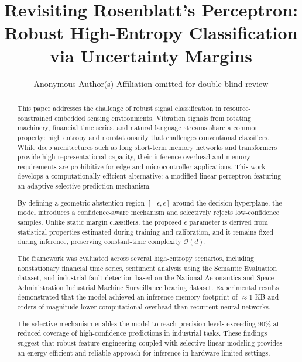 \documentclass[conference]{IEEEtran}
\begin{document}
\title{Revisiting Rosenblatt’s Perceptron: Robust High-Entropy Classification via Uncertainty Margins}

\author{
    Anonymous Author(s) Affiliation omitted for double-blind review
}

\maketitle

\begin{abstract}
This paper addresses the challenge of robust signal classification in resource-constrained embedded sensing environments. Vibration signals from rotating machinery, financial time series, and natural language streams share a common property: high entropy and nonstationarity that challenges conventional classifiers. While deep architectures such as long short-term memory networks and transformers provide high representational capacity, their inference overhead and memory requirements are prohibitive for edge and microcontroller applications. This work develops a computationally efficient alternative: a modified linear perceptron featuring an adaptive selective prediction mechanism. 

By defining a geometric abstention region $[-\epsilon, \epsilon]$ around the decision hyperplane, the model introduces a confidence-aware mechanism and selectively rejects low-confidence samples. Unlike static margin classifiers, the proposed $\epsilon$ parameter is derived from statistical properties estimated during training and calibration, and it remains fixed during inference, preserving constant-time complexity $\mathcal{O}(d)$.

The framework was evaluated across several high-entropy scenarios, including nonstationary financial time series, sentiment analysis using the Semantic Evaluation dataset, and industrial fault detection based on the National Aeronautics and Space Administration Industrial Machine Surveillance bearing dataset. Experimental results demonstrated that the model achieved an inference memory footprint of $\approx 1$ KB and orders of magnitude lower computational overhead than recurrent neural networks. 

The selective mechanism enables the model to reach precision levels exceeding 90\% at reduced coverage of high-confidence predictions in industrial tasks. These findings suggest that robust feature engineering coupled with selective linear modeling provides an energy-efficient and reliable approach for inference in hardware-limited settings.
\end{abstract}
\end{document}
